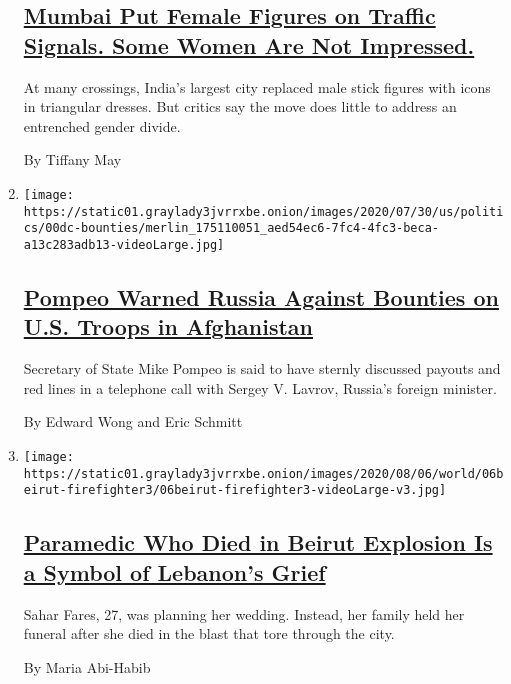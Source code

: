 \begin{enumerate}
{  \subsection{\texorpdfstring{\href{/2020/08/06/world/asia/mumbai-traffic-light-woman-india.html}{Mumbai
  Put Female Figures on Traffic Signals. Some Women Are Not
  Impressed.}}{Mumbai Put Female Figures on Traffic Signals. Some Women Are Not Impressed.}}\label{mumbai-put-female-figures-on-traffic-signals-some-women-are-not-impressed}}

  At many crossings, India's largest city replaced male stick figures
  with icons in triangular dresses. But critics say the move does little
  to address an entrenched gender divide.

  By Tiffany May
\item
  \texttt{[image: https://static01.graylady3jvrrxbe.onion/images/2020/07/30/us/politics/00dc-bounties/merlin\_175110051\_aed54ec6-7fc4-4fc3-beca-a13c283adb13-videoLarge.jpg]}

  \hypertarget{pompeo-warned-russia-against-bounties-on-us-troops-in-afghanistan}{%
  \subsection{\texorpdfstring{\href{/2020/08/07/world/asia/pompeo-russia-afghanistan-bounties.html}{Pompeo
  Warned Russia Against Bounties on U.S. Troops in
  Afghanistan}}{Pompeo Warned Russia Against Bounties on U.S. Troops in Afghanistan}}\label{pompeo-warned-russia-against-bounties-on-us-troops-in-afghanistan}}

  Secretary of State Mike Pompeo is said to have sternly discussed
  payouts and red lines in a telephone call with Sergey V. Lavrov,
  Russia's foreign minister.

  By Edward Wong and Eric Schmitt
\item
  \texttt{[image: https://static01.graylady3jvrrxbe.onion/images/2020/08/06/world/06beirut-firefighter3/06beirut-firefighter3-videoLarge-v3.jpg]}

  \hypertarget{paramedic-who-died-in-beirut-explosion-is-a-symbol-of-lebanons-grief}{%
  \subsection{\texorpdfstring{\href{/2020/08/06/world/middleeast/Beirut-explosion-paramedic-Fares.html}{Paramedic
  Who Died in Beirut Explosion Is a Symbol of Lebanon's
  Grief}}{Paramedic Who Died in Beirut Explosion Is a Symbol of Lebanon's Grief}}\label{paramedic-who-died-in-beirut-explosion-is-a-symbol-of-lebanons-grief}}

  Sahar Fares, 27, was planning her wedding. Instead, her family held
  her funeral after she died in the blast that tore through the city.

  By Maria Abi-Habib
\end{enumerate}

